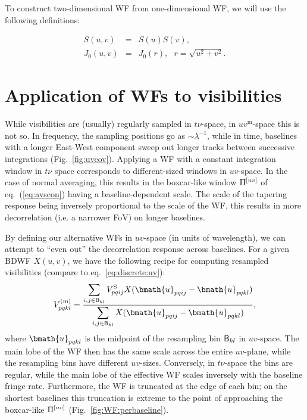 \documentclass[useAMS,usenatbib]{mn2e}
\newcommand{\OMS}[1]{\textcolor{red}{{\bf OMS: #1}}}
\begin{document}
To construct two-dimensional  WF from one-dimensional WF, we will use the following definitions:


\begin{eqnarray}
S(u,v) &=& S(u)S(v), \nonumber\\
J_0(u,v) &=& J_0(r), ~~~r=\sqrt{u^2+v^2}.\nonumber
\end{eqnarray}


\section{Application of WFs to visibilities}

While visibilities are (usually) regularly sampled in $t\nu$-space, in $uv^\mathrm{m}$-space this is not so. In frequency, 
the sampling positions go as $\sim\lambda^{-1}$, while in time, baselines with a longer East-West component sweep out longer tracks between successive 
integrations (Fig.~\ref{fig:uvcov}). Applying a WF with a constant integration window in $t\nu$ space corresponds to 
different-sized windows in $uv$-space. In the case of normal averaging, this results in the boxcar-like window $\Pi^{[uv]}$ of 
eq.~(\ref{eq:avscon}) having a baseline-dependent scale. The scale of the tapering response being inversely proportional to 
the scale of the WF, this results in more decorrelation (i.e. a narrower FoV) on longer baselines.

By defining our alternative WFs in $uv$-space (in units of wavelength), we can attempt to ``even out'' the decorrelation 
response across baselines. For a given BDWF $X(u,v)$, we have the following recipe 
for computing resampled visibilities (compare to eq.~\ref{eq:discrete:uv}):
\begin{equation}
\label{eq:avg:wf}
V^\mathrm{(m)}_{pqkl} = \frac{\displaystyle\sum\limits_{{i,j}\in \Bij_{kl}} \Vs_{pqij} X(\bmath{u}_{pqij}-\bmath{u}_{pqkl})}
{\displaystyle\sum\limits_{{i,j}\in \Bij_{kl}} X(\bmath{u}_{pqij}-\bmath{u}_{pqkl})},
\end{equation}
where $\bmath{u}_{pqkl}$ is the midpoint of the resampling bin $\mathsf{B}_{kl}$ in $uv$-space. The main lobe of the WF then 
has the same scale across the entire $uv$-plane, while the resampling bins have different $uv$-sizes. Conversely, in 
$t\nu$-space the bins
are regular, while the main lobe of the effective WF scales inversely with the baseline fringe rate. Furthermore, 
the WF is truncated at the edge of each bin; on the shortest baselines this truncation is extreme to the 
point of approaching the boxcar-like $\Pi^{[uv]}$ (Fig.~\ref{fig:WF:perbaseline}).
\end{document}

